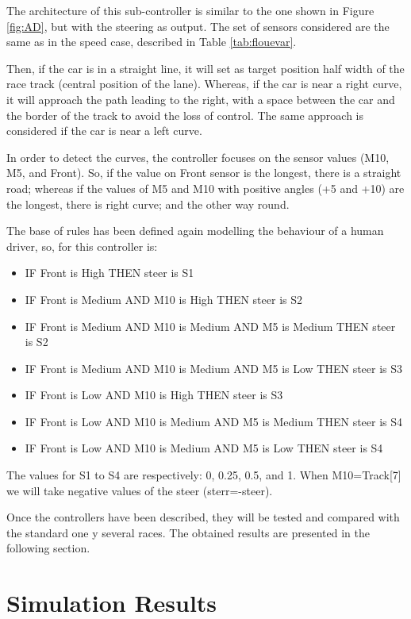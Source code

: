 \documentclass[runningheads,a4paper]{llncs}
\begin{document}
	The architecture of this sub-controller is similar to the one shown in Figure \ref{fig:AD}, but with the steering as output. The set of sensors considered are the same as in the speed case, described in Table \ref{tab:flouevar}.
	
	Then, if the car is in a straight line, it will set as target position half width of the race track (central position of the lane).	Whereas, if the car is near a right curve, it will approach the path leading to the right, with a space between the car and the border of the track to avoid the loss of control. The same approach is considered if the car is near a left curve.
	
	In order to detect the curves, the controller focuses on the sensor values (M10, M5, and Front). So, if the value on Front sensor is the longest, there is a straight road; whereas if the values of M5 and M10 with positive angles (+5 and +10) are the longest, there is right curve; and the other way round.
	
	The base of rules has been defined again modelling the behaviour of a human driver, so, for this controller is:
	
	\begin{itemize}		
		\item IF Front is High THEN steer is S1
		\item IF Front is Medium AND M10 is High THEN  steer is S2
		\item IF Front is Medium AND M10 is Medium AND M5 is Medium THEN steer is S2
		\item IF Front is Medium AND M10 is Medium AND M5 is Low THEN steer is S3
		\item IF Front is Low AND M10 is High THEN steer is S3
		\item IF Front is Low AND M10 is Medium AND M5 is Medium THEN steer is S4
		\item IF Front is Low AND M10 is Medium AND M5 is Low THEN steer is S4
	\end{itemize}	
	
	The values for S1 to S4 are respectively: 0, 0.25, 0.5, and 1.
	When M10=Track[7] we will take negative values of the steer (sterr=-steer).
	
	Once the controllers have been described, they will be tested and compared with the standard one y several races. The obtained results are presented in the following section.
	\section{Simulation Results}
	\label{sec:results}
	
\end{document}
